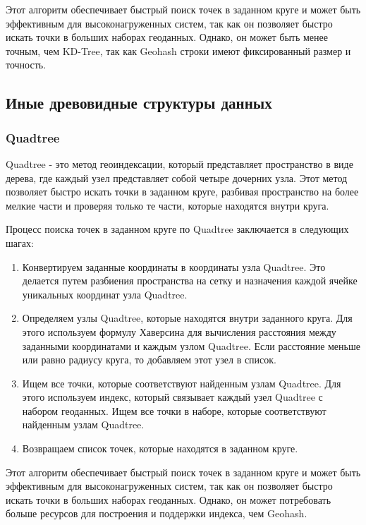 Этот алгоритм обеспечивает быстрый поиск точек в заданном круге и может быть эффективным для высоконагруженных систем, так как он позволяет быстро искать точки в больших наборах геоданных. Однако, он может быть менее точным, чем KD-Tree, так как Geohash строки имеют фиксированный размер и точность.

\subsection{Иные древовидные структуры данных}

\subsubsection{Quadtree}
Quadtree - это метод геоиндексации, который представляет пространство в виде дерева, где каждый узел представляет собой четыре дочерних узла. Этот метод позволяет быстро искать точки в заданном круге, разбивая пространство на более мелкие части и проверяя только те части, которые находятся внутри круга.

Процесс поиска точек в заданном круге по Quadtree заключается в следующих шагах:
\begin{enumerate}
    \item Конвертируем заданные координаты в координаты узла Quadtree. Это делается путем разбиения пространства на сетку и назначения каждой ячейке уникальных координат узла Quadtree.
    \item Определяем узлы Quadtree, которые находятся внутри заданного круга. Для этого используем формулу Хаверсина для вычисления расстояния между заданными координатами и каждым узлом Quadtree. Если расстояние меньше или равно радиусу круга, то добавляем этот узел в список.
    \item Ищем все точки, которые соответствуют найденным узлам Quadtree. Для этого используем индекс, который связывает каждый узел Quadtree с набором геоданных. Ищем все точки в наборе, которые соответствуют найденным узлам Quadtree.
    \item Возвращаем список точек, которые находятся в заданном круге.
\end{enumerate}

Этот алгоритм обеспечивает быстрый поиск точек в заданном круге и может быть эффективным для высоконагруженных систем, так как он позволяет быстро искать точки в больших наборах геоданных. Однако, он может потребовать больше ресурсов для построения и поддержки индекса, чем Geohash.

